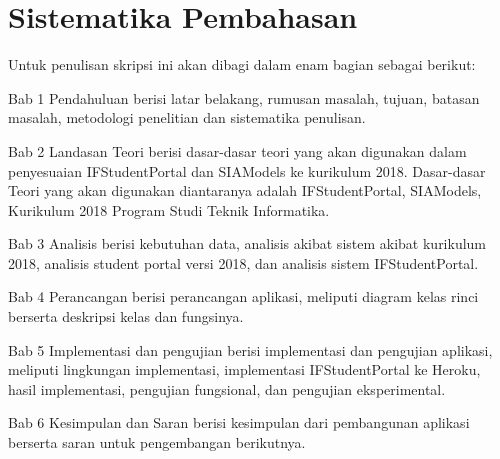 \section{Sistematika Pembahasan}
\label{sec:sispem}
Untuk penulisan skripsi ini akan dibagi dalam enam bagian sebagai berikut:

Bab 1 Pendahuluan berisi latar belakang, rumusan masalah, tujuan, batasan masalah, metodologi penelitian dan sistematika penulisan.

Bab 2 Landasan Teori berisi dasar-dasar teori yang akan digunakan dalam penyesuaian IFStudentPortal dan SIAModels ke kurikulum 2018. Dasar-dasar Teori yang akan digunakan diantaranya adalah IFStudentPortal, SIAModels, Kurikulum 2018 Program Studi Teknik Informatika. 

Bab 3 Analisis berisi kebutuhan data, analisis akibat sistem akibat kurikulum 2018, analisis student portal versi 2018, dan analisis sistem IFStudentPortal.

Bab 4 Perancangan berisi perancangan aplikasi, meliputi diagram kelas rinci berserta deskripsi kelas dan fungsinya.

Bab 5 Implementasi dan pengujian berisi implementasi dan pengujian aplikasi, meliputi lingkungan implementasi, implementasi IFStudentPortal ke Heroku, hasil implementasi, pengujian fungsional, dan pengujian eksperimental.

Bab 6 Kesimpulan dan Saran berisi kesimpulan dari pembangunan aplikasi berserta saran untuk pengembangan berikutnya.